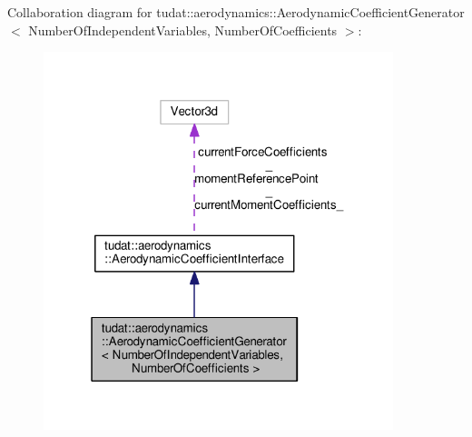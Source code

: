 Collaboration diagram for tudat\+:\+:aerodynamics\+:\+:Aerodynamic\+Coefficient\+Generator$<$ Number\+Of\+Independent\+Variables, Number\+Of\+Coefficients $>$\+:
\nopagebreak
\begin{figure}[H]
\begin{center}
\leavevmode
\includegraphics[width=289pt]{classtudat_1_1aerodynamics_1_1AerodynamicCoefficientGenerator__coll__graph}
\end{center}
\end{figure}
